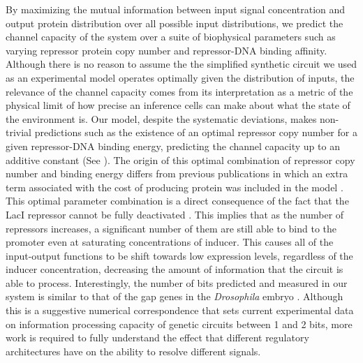 By maximizing the mutual information between input signal concentration and
output protein distribution over all possible input distributions, we predict
the channel capacity of the system over a suite of biophysical parameters such
as varying repressor protein copy number and repressor-DNA binding affinity.
Although there is no reason to assume the the simplified synthetic circuit we
used as an experimental model operates optimally given the distribution of
inputs, the relevance of the channel capacity comes from its interpretation as a
metric of the physical limit of how precise an inference cells can make about
what the state of the environment is. Our model, despite the systematic
deviations, makes non-trivial predictions such as the existence of an optimal
repressor copy number for a given repressor-DNA binding energy, predicting the
channel capacity up to an additive constant (See ). The
origin of this optimal combination of repressor copy number and binding energy
differs from previous publications in which an extra term associated with the
cost of producing protein was included in the model \cite{Tkacik2011}. This
optimal parameter combination is a direct consequence of the fact that the LacI
repressor cannot be fully deactivated \cite{Razo-Mejia2018}. This implies that
as the number of repressors increases, a significant number of them are still
able to bind to the promoter even at saturating concentrations of inducer. This
causes all of the input-output functions to be shift towards low expression
levels, regardless of the inducer concentration, decreasing the amount of
information that the circuit is able to process. Interestingly, the number of
bits predicted and measured in our system is similar to that of the gap genes in
the \textit{Drosophila} embryo \cite{Dubuis2013}. Although this is a suggestive
numerical correspondence that sets current experimental data on information
processing capacity of genetic circuits between 1 and 2 bits, more work is
required to fully understand the effect that different regulatory architectures
have on the ability to resolve different signals. 

